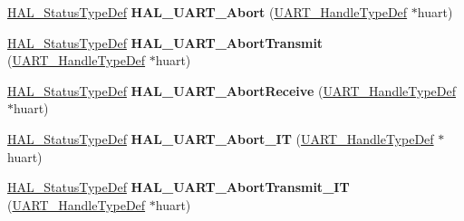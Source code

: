 \begin{DoxyCompactItemize}
\item 
\mbox{\label{group___u_a_r_t___exported___functions___group2_ga2d7be1f59fc810f49dadc580307a4862}} 
\hyperlink{stm32f0xx__hal__def_8h_a63c0679d1cb8b8c684fbb0632743478f}{H\+A\+L\+\_\+\+Status\+Type\+Def} {\bfseries H\+A\+L\+\_\+\+U\+A\+R\+T\+\_\+\+Abort} (\hyperlink{struct_u_a_r_t___handle_type_def}{U\+A\+R\+T\+\_\+\+Handle\+Type\+Def} $\ast$huart)
\item 
\mbox{\label{group___u_a_r_t___exported___functions___group2_ga5a8858ffca45541416097961523d5fb2}} 
\hyperlink{stm32f0xx__hal__def_8h_a63c0679d1cb8b8c684fbb0632743478f}{H\+A\+L\+\_\+\+Status\+Type\+Def} {\bfseries H\+A\+L\+\_\+\+U\+A\+R\+T\+\_\+\+Abort\+Transmit} (\hyperlink{struct_u_a_r_t___handle_type_def}{U\+A\+R\+T\+\_\+\+Handle\+Type\+Def} $\ast$huart)
\item 
\mbox{\label{group___u_a_r_t___exported___functions___group2_ga9732372cfae60c019bb41554ab12edd6}} 
\hyperlink{stm32f0xx__hal__def_8h_a63c0679d1cb8b8c684fbb0632743478f}{H\+A\+L\+\_\+\+Status\+Type\+Def} {\bfseries H\+A\+L\+\_\+\+U\+A\+R\+T\+\_\+\+Abort\+Receive} (\hyperlink{struct_u_a_r_t___handle_type_def}{U\+A\+R\+T\+\_\+\+Handle\+Type\+Def} $\ast$huart)
\item 
\mbox{\label{group___u_a_r_t___exported___functions___group2_ga3183626ee21f103cbcb50241eca50e4d}} 
\hyperlink{stm32f0xx__hal__def_8h_a63c0679d1cb8b8c684fbb0632743478f}{H\+A\+L\+\_\+\+Status\+Type\+Def} {\bfseries H\+A\+L\+\_\+\+U\+A\+R\+T\+\_\+\+Abort\+\_\+\+IT} (\hyperlink{struct_u_a_r_t___handle_type_def}{U\+A\+R\+T\+\_\+\+Handle\+Type\+Def} $\ast$huart)
\item 
\mbox{\label{group___u_a_r_t___exported___functions___group2_ga0fba12f56413e2dbe8b96040ecf5aa7e}} 
\hyperlink{stm32f0xx__hal__def_8h_a63c0679d1cb8b8c684fbb0632743478f}{H\+A\+L\+\_\+\+Status\+Type\+Def} {\bfseries H\+A\+L\+\_\+\+U\+A\+R\+T\+\_\+\+Abort\+Transmit\+\_\+\+IT} (\hyperlink{struct_u_a_r_t___handle_type_def}{U\+A\+R\+T\+\_\+\+Handle\+Type\+Def} $\ast$huart)
\item 
\mbox{\label{group___u_a_r_t___exported___functions___group2_gaad7bc5748b849abc29d18b2ddd02876f}} 

\end{DoxyCompactItemize}
